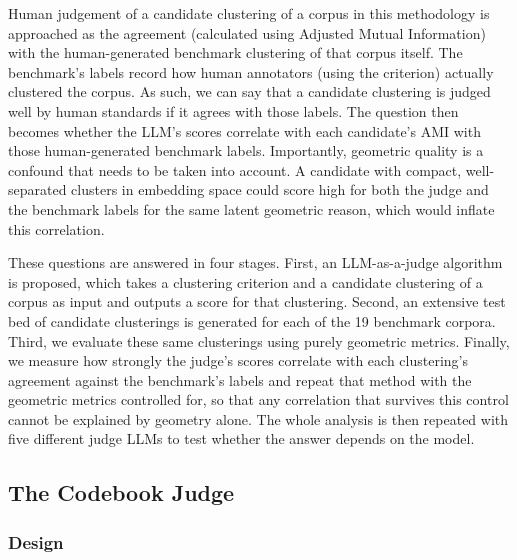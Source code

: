 \documentclass[11pt,a4paper,oneside]{report}
\begin{document}
Human judgement of a candidate clustering of a corpus in this methodology is approached as the agreement (calculated using Adjusted Mutual Information) with the human-generated benchmark clustering of that corpus itself. The benchmark's labels record how human annotators (using the criterion) actually clustered the corpus. As such, we can say that a candidate clustering is judged well by human standards if it agrees with those labels. The question then becomes whether the LLM's scores correlate with each candidate's AMI with those human-generated benchmark labels. Importantly, geometric quality is a confound that needs to be taken into account. A candidate with compact, well-separated clusters in embedding space could score high for both the judge and the benchmark labels for the same latent geometric reason, which would inflate this correlation.

These questions are answered in four stages. First, an LLM-as-a-judge algorithm is proposed, which takes a clustering criterion and a candidate clustering of a corpus as input and outputs a score for that clustering. Second, an extensive test bed of candidate clusterings is generated for each of the 19 benchmark corpora. Third, we evaluate these same clusterings using purely geometric metrics. Finally, we measure how strongly the judge's scores correlate with each clustering's agreement against the benchmark's labels and repeat that method with the geometric metrics controlled for, so that any correlation that survives this control cannot be explained by geometry alone. The whole analysis is then repeated with five different judge LLMs to test whether the answer depends on the model.

\subsection{The Codebook Judge}\label{sec:CODEBOOKJUDGE}

\subsubsection{Design}
\end{document}
